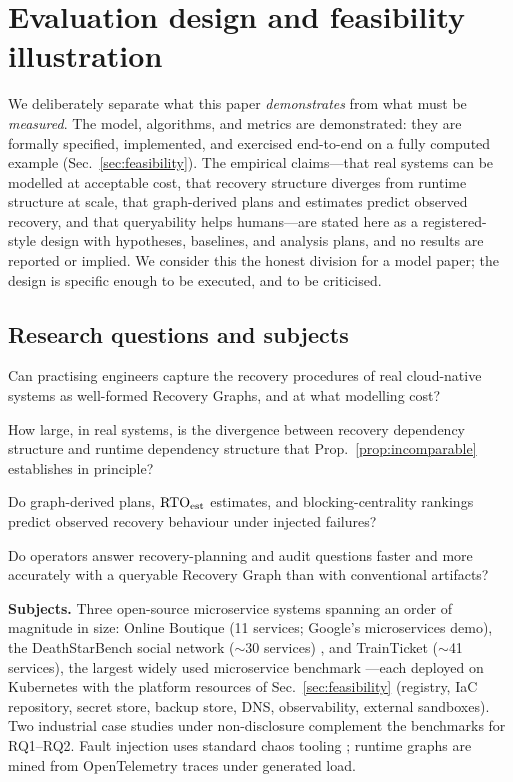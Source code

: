 \section{Evaluation design and feasibility illustration}
\label{sec:eval}

We deliberately separate what this paper \emph{demonstrates} from what must be \emph{measured}. The model, algorithms, and metrics are demonstrated: they are formally specified, implemented, and exercised end-to-end on a fully computed example (Sec.~\ref{sec:feasibility}). The empirical claims---that real systems can be modelled at acceptable cost, that recovery structure diverges from runtime structure at scale, that graph-derived plans and estimates predict observed recovery, and that queryability helps humans---are stated here as a registered-style design with hypotheses, baselines, and analysis plans, and no results are reported or implied. We consider this the honest division for a model paper; the design is specific enough to be executed, and to be criticised.

\subsection{Research questions and subjects}
\label{sec:rqs}

\begin{description}[leftmargin=1.4em,itemsep=2pt]
\item[RQ1 (Expressiveness and cost).] Can practising engineers capture the recovery procedures of real cloud-native systems as well-formed Recovery Graphs, and at what modelling cost?
\item[RQ2 (Divergence).] How large, in real systems, is the divergence between recovery dependency structure and runtime dependency structure that Prop.~\ref{prop:incomparable} establishes in principle?
\item[RQ3 (Predictive utility).] Do graph-derived plans, $\mathrm{RTO}_{\mathrm{est}}$ estimates, and blocking-centrality rankings predict observed recovery behaviour under injected failures?
\item[RQ4 (Queryability and governance value).] Do operators answer recovery-planning and audit questions faster and more accurately with a queryable Recovery Graph than with conventional artifacts?
\end{description}

\noindent\textbf{Subjects.} Three open-source microservice systems spanning an order of magnitude in size: Online Boutique (11 services; Google's microservices demo), the DeathStarBench social network ($\sim$30 services) \citep{gan2019deathstar}, and TrainTicket ($\sim$41 services), the largest widely used microservice benchmark \citep{zhou2021fault}---each deployed on Kubernetes with the platform resources of Sec.~\ref{sec:feasibility} (registry, IaC repository, secret store, backup store, DNS, observability, external sandboxes). Two industrial case studies under non-disclosure complement the benchmarks for RQ1--RQ2. Fault injection uses standard chaos tooling \citep{litmuschaos}; runtime graphs are mined from OpenTelemetry traces under generated load.

